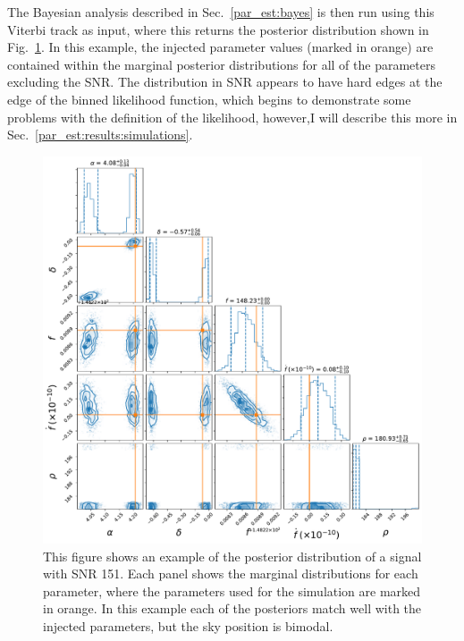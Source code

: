 The Bayesian analysis described in Sec.~\ref{par_est:bayes} is then run using this Viterbi track as input, where this returns the posterior distribution shown in Fig.~\ref{par_est:results:example_posterior}.
In this example, the injected parameter values (marked in orange) are contained within the marginal posterior distributions for all of the parameters excluding the \gls{SNR}.
The distribution in \gls{SNR} appears to have hard edges at the edge of the binned likelihood function, which begins to demonstrate some problems with the definition of the likelihood, however,I will describe this more in Sec.~\ref{par_est:results:simulations}.
%
\begin{figure}[pt]

    \centering
    \includegraphics[width=\linewidth]{C5_parameter/cornerplot.pdf}
    \caption[KDE of likelihood in different \gls{SNR} ranges]{This figure shows an example of the posterior distribution of a signal with \gls{SNR} 151. Each panel shows the marginal distributions for each parameter, where the parameters used for the simulation are marked in orange. In this example each of the posteriors match well with the injected parameters, but the sky position is bimodal. }
    \label{par_est:results:example_posterior}
    
\end{figure}
%

